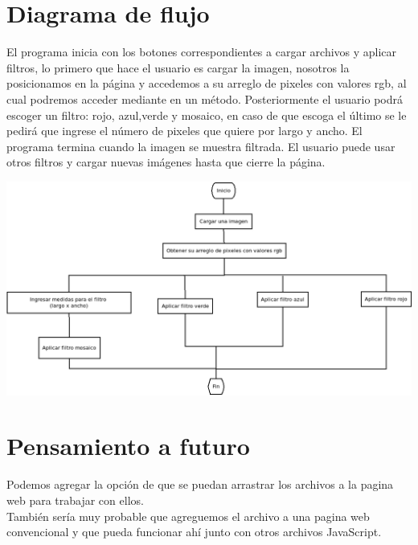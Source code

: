 \documentclass{article}
\begin{document}
\section{Diagrama de flujo} El programa inicia con los botones correspondientes a cargar archivos y aplicar filtros, lo primero que hace el usuario es cargar la imagen, nosotros la posicionamos en la página y accedemos a su arreglo de pixeles con valores rgb, al cual podremos acceder mediante en un método. Posteriormente el usuario podrá escoger un filtro: rojo, azul,verde y mosaico, en caso de que escoga el último se le pedirá que ingrese el número de pixeles que quiere por largo y ancho. El programa termina cuando la imagen se muestra filtrada. El usuario puede usar otros filtros y cargar nuevas imágenes hasta que cierre la página.
	\begin{center}
		\includegraphics[width=\linewidth]{DiagramaDeFlujo}
	\end{center}

\section{Pensamiento a futuro}
Podemos agregar la opción de que se puedan arrastrar los archivos a la pagina web para trabajar con ellos.\\
También sería muy probable que agreguemos el archivo a una pagina web convencional y que pueda funcionar ahí junto con otros archivos JavaScript.
\end{document}
